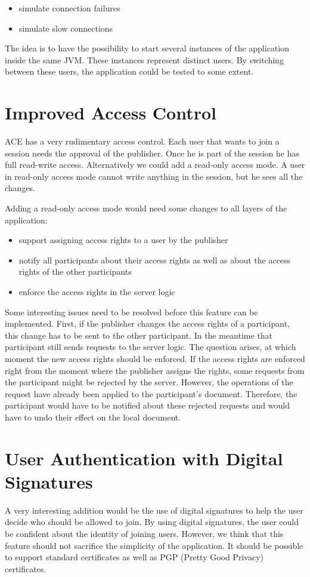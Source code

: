 \begin{itemize}
 \item simulate connection failures
 \item simulate slow connections
\end{itemize}

The idea is to have the possibility to start several instances of the
application inside the same JVM. These instances represent distinct users.
By switching between these users, the application could be tested to
some extent.



\section{Improved Access Control}
ACE has a very rudimentary access control. Each user that wants to join a
session needs the approval of the publisher. Once he is part of the session
he has full read-write access. Alternatively we could add a read-only
access mode. A user in read-only access mode cannot write anything in
the session, but he sees all the changes.

Adding a read-only access mode would need some changes to all layers of
the application:

\begin{itemize}
 \item support assigning access rights to a user by the publisher
 \item notify all participants about their access rights as well as about
       the access rights of the other participants
 \item enforce the access rights in the server logic
\end{itemize}

Some interesting issues need to be resolved before this feature can be
implemented. First, if the publisher changes the access rights of a 
participant, this change has to be sent to the other participant. In the
meantime that participant still sends requests to the server logic. The
question arises, at which moment the new access rights should be enforced.
If the access rights are enforced right from the moment where the publisher
assigns the rights, some requests from the participant might be rejected by the 
server. However, the operations of the request have already been applied
to the participant's document. Therefore, the participant would have to
be notified about these rejected requests and would have to undo their
effect on the local document.



\section{User Authentication with Digital Signatures}
A very interesting addition would be the use of digital signatures to help
the user decide who should be allowed to join. By using digital
signatures, the user could be confident about the identity of joining users.
However, we think that this feature should not sacrifice the simplicity
of the application. It should be possible to support standard certificates
as well as PGP (Pretty Good Privacy) certificates.




